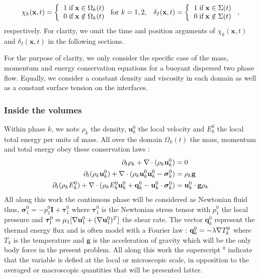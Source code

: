 \begin{align}
    \chi_k(\textbf{x},t) =  \left\{
      \begin{tabular}{cc}
        $1 \;\text{if} \;\textbf{x} \in \Omega_k(t)$\\
        $0 \;\text{if} \;\textbf{x} \notin \Omega_k(t)$
      \end{tabular}
      \right.
      \text{for $k = 1,2$},
    && \delta_I(\textbf{x},t) =  \left\{
      \begin{tabular}{cc}
        $1 \;\text{if} \;\textbf{x} \in \Sigma(t)$\\
        $0 \;\text{if} \;\textbf{x} \notin \Sigma(t)$
      \end{tabular}
      \right.,
      \label{eq:PIF}
\end{align}
respectively. 
For clarity, we omit the time and position arguments of $\chi_k(\textbf{x},t)$ and $\delta_I(\textbf{x},t)$ in the following sections. 

For the purpose of clarity, we only consider the specific case of the mass, momentum and energy conservation equations for a buoyant dispersed two phase flow.
Equally, we consider a constant density and viscosity in each domain as well as a constant surface tension on the interfaces.

\subsubsection{Inside the volumes}

Within phase $k$, we note $\rho_k$ the density, $\textbf{u}_k^0$ the local velocity and $E_k^0$ the local total energy per units of mass.
All over the domain $\Omega_k(t)$ the mass, momentum and total energy obey these conservation laws :
\begin{align}
    \label{eq:dt_rho}
    \partial_t \rho_k  
    + \mathbf{\nabla}\cdot (
        \rho_k\textbf{u}_k^0
    )
    &= 
    0\\
    \label{eq:dt_rhou_k}
    \partial_t (\rho_k\textbf{u}_k^0)  
    + \mathbf{\nabla}\cdot (
        \rho_k\textbf{u}_k^0\textbf{u}_k^0
        - \bm{\sigma}_k^0 
    )
    &= 
    \rho_k \textbf{g}\\
    \label{eq:dt_rhoE_k}
    \partial_t (\rho_kE_k^0)  
    + \mathbf{\nabla}\cdot (
        \rho_kE_k^0\textbf{u}_k^0
        + \textbf{q}_k^0
        - \textbf{u}_k^0 \cdot \bm{\sigma}_k^0 
        )
    &= 
    \textbf{u}_k^0 \cdot \textbf{g}  \rho_k
\end{align} 
All along this work the continuous phase will be considered as Newtonian fluid thus, $\bm{\sigma}_1^0 = - p_1^0 \textbf{I} + \bm{\tau}_1^0$ where $\bm{\tau}_1^0$ is the Newtonian stress tensor with $p_1 ^0$ the local pressure and $\bm{\tau}_1^0 = \mu_1[\mathbf{\nabla} \textbf{u}_1^0+(\mathbf{\nabla} \textbf{u}_1^0)^T]$ the shear rate. 
The vector $\textbf{q}_k^0$ represent the thermal energy flux and is often model with a Fourier law : $\textbf{q}_k^0 = -\lambda \mathbf{\nabla} T_k^0$ where $T_k$ is the temperature and $\textbf{g}$ is the acceleration of gravity which will be the only body force in the present problem. 
All along this work the superscript $^0$ indicate that the variable is defied at the local or microscopic scale, in opposition to the averaged or macroscopic quantities that will be presented latter. 

